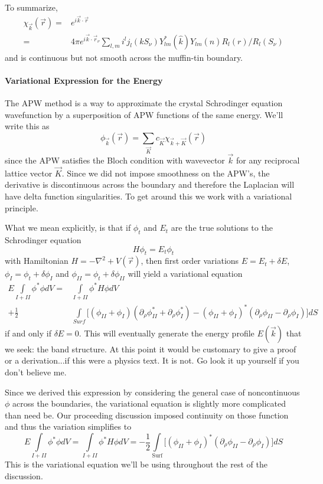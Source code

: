 \documentclass[11pt]{article}
\numberwithin{equation}{section}
\begin{document}
To summarize,
\begin{align}
\chi_{\vec{k}}(\vec{r}) = &e^{i\vec{k}\cdot\vec{r}} \\
= &4\pi e^{i\vec{k}\cdot\vec{r}_{\nu}}\sum_{l,m}i^l j_l(kS_{\nu})Y^*_{lm}(\hat{k})Y_{lm}(\hat{n})R_l(r)/R_l(S_{\nu})
\end{align}
and is continuous but not smooth across the muffin-tin boundary. 

\paragraph{Variational Expression for the Energy}
The APW method is a way to approximate the crystal Schrodinger equation wavefunction by a superposition of APW functions of the same energy. We'll write this as
\begin{equation}
\phi_{\vec{k}}(\vec{r}) = \sum_{\vec{K}}c_{\vec{K}}\chi_{\vec{k} + \vec{K}}(\vec{r})
\end{equation}
since the APW satisfies the Bloch condition with wavevector $\vec{k}$ for any reciprocal lattice vector $\vec{K}$. Since we did not impose smoothness on the APW's, the derivative is discontinuous across the boundary and therefore the Laplacian will have delta function singularities. To get around this we work with a variational principle.

What we mean explicitly, is that if $\phi_t$ and $E_t$ are the true solutions to the Schrodinger equation
\begin{equation}
H\phi_t = E_t\phi_t
\end{equation}
with Hamiltonian $H = -\nabla^2 + V(\vec{r})$, then first order variations $E = E_t + \delta E$, $\phi_I = \phi_t + \delta \phi_I$ and $\phi_{II} = \phi_t + \delta\phi_{II}$ will yield a variational equation
\begin{align} 
E\int\limits_{I+II}\phi^*\phi dV = &\int\limits_{I+II}\phi^*H\phi dV \nonumber \\
+ \frac{1}{2}&\int\limits_{Surf}\big[(\phi_{II}+\phi_I)(\partial_{\rho}\phi^*_{II} + \partial_{\rho}\phi^*_I) - (\phi_{II} + \phi_I)^*(\partial_{\rho}\phi_{II} - \partial_{\rho}\phi_I)\big]dS
\end{align}
if and only if $\delta E = 0$. This will eventually generate the energy profile $E(\vec{k})$ that we seek: the band structure. At this point it would be customary to give a proof or a derivation...if this were a physics text. It is not. Go look it up yourself if you don't believe me.

Since we derived this expression by considering the general case of noncontinuous $\phi$ across the boundaries, the variational equation is slightly more complicated than need be. Our proceeding discussion imposed continuity on those function and thus the variation simplifies to
\begin{equation} \label{eq:varPrinc}
E\int\limits_{I+II}\phi^*\phi dV = \int\limits_{I+II}\phi^*H\phi dV = -\frac{1}{2}\int\limits_{\mathrm{Surf}}\big[(\phi_{II} + \phi_I)^*(\partial_{\rho}\phi_{II} - \partial_{\rho}\phi_I)\big]dS
\end{equation}
This is the variational equation we'll be using throughout the rest of the discussion.
\end{document}
